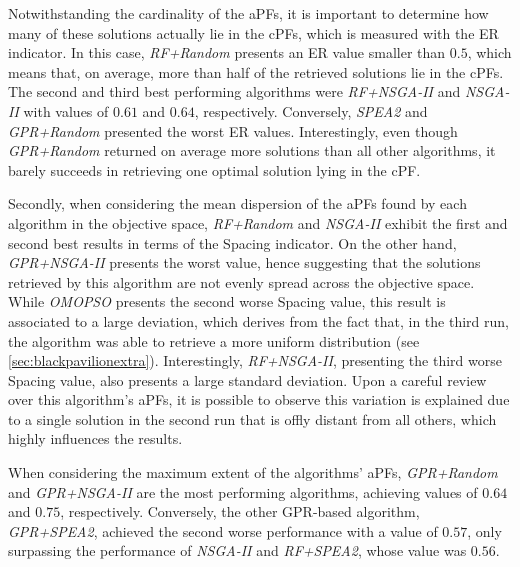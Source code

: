 Notwithstanding the cardinality of the \acp{aPF}, it is important to determine how many of these solutions actually lie in the \acp{cPF}, which is measured with the \ac{ER} indicator. In this case, \textit{RF+Random} presents an \ac{ER} value smaller than $0.5$, which means that, on average, more than half of the retrieved solutions lie in the \acp{cPF}. The second and third best performing algorithms were \textit{RF+NSGA-II} and \textit{NSGA-II} with values of $0.61$ and $0.64$, respectively. Conversely, \textit{SPEA2} and \textit{GPR+Random} presented the worst \ac{ER} values. Interestingly, even though \textit{GPR+Random} returned on average more solutions than all other algorithms, it barely succeeds in retrieving one optimal solution lying in the \ac{cPF}.

Secondly, when considering the mean dispersion of the \acp{aPF} found by each algorithm in the objective space, \textit{RF+Random} and \textit{NSGA-II} exhibit the first and second best results in terms of the Spacing indicator. On the other hand, \textit{GPR+NSGA-II} presents the worst value, hence suggesting that the solutions retrieved by this algorithm are not evenly spread across the objective space. While \textit{OMOPSO} presents the second worse Spacing value, this result is associated to a large deviation, which derives from the fact that, in the third run, the algorithm was able to retrieve a more uniform distribution (see \cref{sec:blackpavilionextra}). Interestingly, \textit{RF+NSGA-II}, presenting the third worse Spacing value, also presents a large standard deviation. Upon a careful review over this algorithm's \acp{aPF}, it is possible to observe this variation is explained due to a single solution in the second run that is offly distant from all others, which highly influences the results. 

When considering the maximum extent of the algorithms' \acp{aPF}, \textit{GPR+Random} and \textit{GPR+NSGA-II} are the most performing algorithms, achieving values of $0.64$ and $0.75$, respectively. Conversely, the other \ac{GPR}-based algorithm, \textit{GPR+SPEA2}, achieved the second worse performance with a value of $0.57$, only surpassing the performance of \textit{NSGA-II} and \textit{RF+SPEA2}, whose value was $0.56$. 

